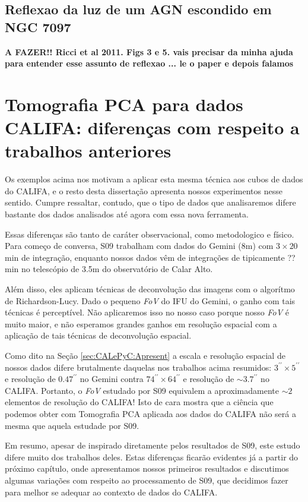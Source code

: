 \subsection{Reflexao da luz de um AGN escondido em NGC 7097}

{\bf\ojo A FAZER!! Ricci et al 2011. Figs 3 e 5. vais precisar da minha ajuda para entender esse assunto de
reflexao ... le o paper e depois falamos}

\section{Tomografia PCA para dados CALIFA: diferen\c{c}as com respeito a trabalhos anteriores}

Os exemplos acima nos motivam a aplicar esta mesma técnica aos cubos de dados do CALIFA, e o resto desta dissertação
apresenta nossos experimentos nesse sentido. Cumpre ressaltar, contudo, que o tipo de dados que analisaremos difere
bastante dos dados analisados até agora com essa nova ferramenta.

Essas diferenças são tanto de caráter observacional, como metodologico e físico. Para começo de conversa, S09 trabalham
com dados do Gemini (8m) com $3 \times 20$ min de integração, enquanto nossos dados vêm de integrações de tipicamente
\ojo ?? min no telescópio de 3.5m do observatório de Calar Alto.

Além disso, eles aplicam técnicas de deconvolução das imagens com o algorítmo de Richardson-Lucy. Dado o pequeno {\em
FoV} do IFU do Gemini, o ganho com tais técnicas é perceptível. Não aplicaremos isso no nosso caso porque nosso {\em
FoV} é muito maior, e não esperamos grandes ganhos em resolução espacial com a aplicação de tais técnicas de
deconvolução espacial.

Como dito na Seção \ref{sec:CALePyC:Apresent} a escala e resolução espacial de nossos dados difere brutalmente daquelas
nos trabalhos acima resumidos: $3^{\prime\prime} \times 5^{\prime\prime}$ e resolução de $0.47^{\prime\prime}$ no Gemini
contra $74^{\prime\prime} \times 64^{\prime\prime}$ e resolução de $\sim3.7^{\prime\prime}$ no CALIFA. Portanto, o {\em
FoV} estudado por S09 equivalem a aproximadamente $\sim2$ elementos de resolução do CALIFA! Isto de cara mostra que a
ciência que podemos obter com Tomografia PCA aplicada aos dados do CALIFA não será a mesma que aquela estudade por S09.

Em resumo, apesar de inspirado diretamente pelos resultados de S09, este estudo difere muito dos trabalhos deles. Estas
diferenças ficarão evidentes já a partir do próximo capítulo, onde apresentamos nossos primeiros resultados e discutimos
algumas variações com respeito ao processamento de S09, que decidimos fazer para melhor se adequar ao contexto de dados
do CALIFA.

